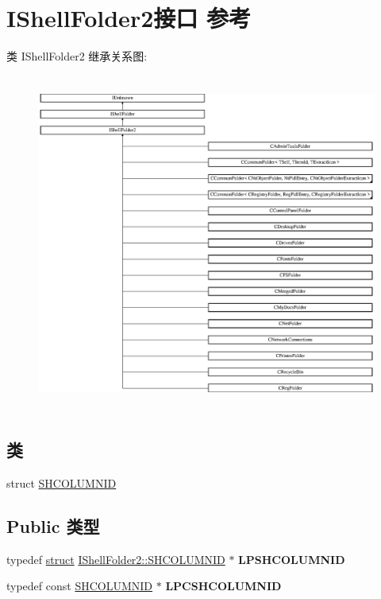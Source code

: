 \hypertarget{interface_i_shell_folder2}{}\section{I\+Shell\+Folder2接口 参考}
\label{interface_i_shell_folder2}
类 I\+Shell\+Folder2 继承关系图\+:\begin{figure}[H]
\begin{center}
\leavevmode
\includegraphics[height=11.176470cm]{interface_i_shell_folder2}
\end{center}
\end{figure}
\subsection*{类}
\begin{DoxyCompactItemize}
\item 
struct \hyperlink{struct_i_shell_folder2_1_1_s_h_c_o_l_u_m_n_i_d}{S\+H\+C\+O\+L\+U\+M\+N\+ID}
\end{DoxyCompactItemize}
\subsection*{Public 类型}
\begin{DoxyCompactItemize}
\item 
\mbox{\label{interface_i_shell_folder2_a44efc032e984126773ea687356823d2c}} 
typedef \hyperlink{interfacestruct}{struct} \hyperlink{struct_i_shell_folder2_1_1_s_h_c_o_l_u_m_n_i_d}{I\+Shell\+Folder2\+::\+S\+H\+C\+O\+L\+U\+M\+N\+ID} $\ast$ {\bfseries L\+P\+S\+H\+C\+O\+L\+U\+M\+N\+ID}
\item 
\mbox{\label{interface_i_shell_folder2_af54118c8c14233ff29b583d9a7aa93bd}} 
typedef const \hyperlink{struct_i_shell_folder2_1_1_s_h_c_o_l_u_m_n_i_d}{S\+H\+C\+O\+L\+U\+M\+N\+ID} $\ast$ {\bfseries L\+P\+C\+S\+H\+C\+O\+L\+U\+M\+N\+ID}
\end{DoxyCompactItemize}
